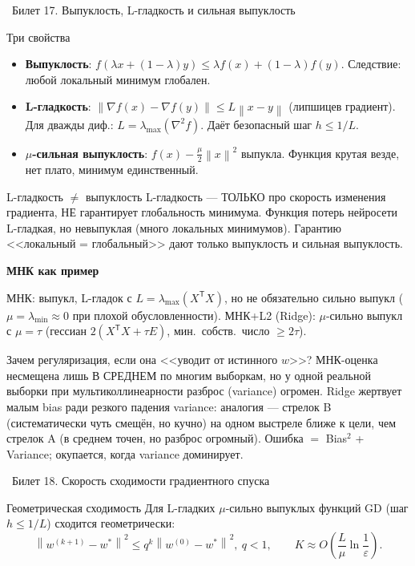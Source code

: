 \documentclass[12pt, a4paper]{article}
\newcommand{\bilet}[2]{%
  \vspace{10pt}%
  \noindent\colorbox{qcolor}{\parbox{\dimexpr\linewidth-2\fboxsep\relax}{%
    \color{white}\large\bfseries\strut\ Билет #1. #2%
  }}%
  \nopagebreak\vspace{5pt}\par\nopagebreak%
}
\newcommand{\qsub}[1]{%
  \vspace{5pt}%
  {\bfseries\color{defblue} #1}%
  \par\vspace{2pt}%
}
\newcommand{\tr}{^{\mathsf{T}}}
\newcommand{\norm}[1]{\left\lVert #1 \right\rVert}
\begin{document}
\bilet{17}{Выпуклость, L-гладкость и сильная выпуклость}

\begin{defbox}{Три свойства}
\begin{itemize}
  \item \textbf{Выпуклость}: $f(\lambda x + (1-\lambda)y) \le \lambda f(x) + (1-\lambda)f(y)$. Следствие: любой локальный минимум глобален.
  \item \textbf{L-гладкость}: $\norm{\nabla f(x) - \nabla f(y)} \le L\norm{x - y}$ (липшицев градиент). Для дважды диф.: $L = \lambda_{\max}(\nabla^2 f)$. Даёт безопасный шаг $h \le 1/L$.
  \item \textbf{$\mu$-сильная выпуклость}: $f(x) - \tfrac\mu2\norm{x}^2$ выпукла. Функция крутая везде, нет плато, минимум единственный.
\end{itemize}
\end{defbox}

\begin{rembox}{L-гладкость $\ne$ выпуклость}
L-гладкость --- ТОЛЬКО про скорость изменения градиента, НЕ гарантирует глобальность минимума. Функция потерь нейросети L-гладкая, но невыпуклая (много локальных минимумов). Гарантию <<локальный = глобальный>> дают только выпуклость и сильная выпуклость.
\end{rembox}

\qsub{МНК как пример}
МНК: выпукл, L-гладок с $L = \lambda_{\max}(X\tr X)$, но не обязательно сильно выпукл ($\mu = \lambda_{\min} \approx 0$ при плохой обусловленности). МНК+L2 (Ridge): $\mu$-сильно выпукл с $\mu = \tau$ (гессиан $2(X\tr X + \tau E)$, мин.\ собств.\ число $\ge 2\tau$).

\begin{fishkabox}
Зачем регуляризация, если она <<уводит от истинного $w$>>? МНК-оценка несмещена лишь В СРЕДНЕМ по многим выборкам, но у одной реальной выборки при мультиколлинеарности разброс (variance) огромен. Ridge жертвует малым bias ради резкого падения variance: аналогия --- стрелок B (систематически чуть смещён, но кучно) на одном выстреле ближе к цели, чем стрелок A (в среднем точен, но разброс огромный). Ошибка $=$ Bias$^2$ + Variance; окупается, когда variance доминирует.
\end{fishkabox}

\bilet{18}{Скорость сходимости градиентного спуска}

\begin{thmbox}{Геометрическая сходимость}
Для L-гладких $\mu$-сильно выпуклых функций GD (шаг $h \le 1/L$) сходится геометрически:
\[
  \norm{w^{(k+1)} - w^*}^2 \le q^k \norm{w^{(0)} - w^*}^2,\ q < 1, \qquad K \approx O\!\left(\frac{L}{\mu}\ln\frac1\varepsilon\right).
\]
\end{thmbox}
\end{document}
